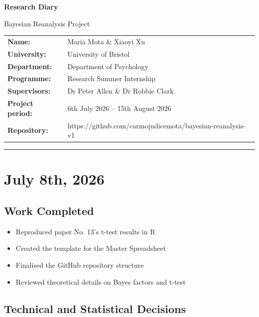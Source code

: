 \documentclass[11pt,a4paper]{article}
\begin{document}
{\Huge \textbf{Research Diary}}

\vspace{0.4em}

{\Large Bayesian Reanalysis Project}

\vspace{1.5em}

\begin{tabularx}{\textwidth}{@{}lX@{}}
\textbf{Name:} & Maria Mota \& Xiaoyi Xu \\
\textbf{University:} & University of Bristol \\
\textbf{Department:} & Department of Psychology \\
\textbf{Programme:} & Research Summer Internship \\
\textbf{Supervisors:} & Dr Peter Allen \& Dr Robbie Clark \\
\textbf{Project period:} & 6th July 2026 -- 15th August 2026 \\
\textbf{Repository:} & https://github.com/carmojudicemota/bayesian-reanalysis-v1 \\
\end{tabularx}

\vspace{1.5em}

\noindent\rule{\textwidth}{0.4pt}

\section{July 8th, 2026}

\subsection{Work Completed}

\begin{itemize}
    \item Reproduced paper No. 13's t-test results in R
    \item Created the template for the Master Spreadsheet
    \item Finalised the GitHub repository structure
    \item Reviewed theoretical details on Bayes factors and t-test

\end{itemize}

\subsection{Technical and Statistical Decisions}
\end{document}
